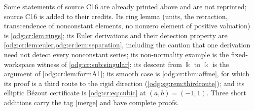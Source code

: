 \documentclass[11pt,oneside]{article}
\numberwithin{equation}{section}
\theoremstyle{definition}
\theoremstyle{remark}
\newcommand{\mergetag}{\textup{\textsf{\small[merge]}}}
\begin{document}
Some statements of source C16 are already printed above and are not reprinted; source C16
is added to their credits. Its ring lemma (units, the retraction, transcendence of
nonconstant elements, no nonzero element of positive valuation) is
\cref{odg:cr:lem:rings}; its Euler derivations and their detection property are
\cref{odg:cr:lem:euler,odg:cr:lem:separation}, including the caution that one derivation
need not detect every nonconstant series; its non-normality example is the
fixed-workspace witness of \cref{odg:cr:sub:singular}; its descent from $\bar\Bbbk$ to
$\Bbbk$ is the argument of \cref{odg:cr:lem:formA1}; its smooth case is
\cref{odg:cr:thm:affine}, for which its proof is a third route to the rigid direction
(\cref{odg:sg:rem:thirdroute}); and its elliptic B\'ezout certificate is
\eqref{odg:cr:eq:cubic} at $(a,b)=(-1,1)$. Three short additions carry the tag
\mergetag{} and have complete proofs.
\end{document}
